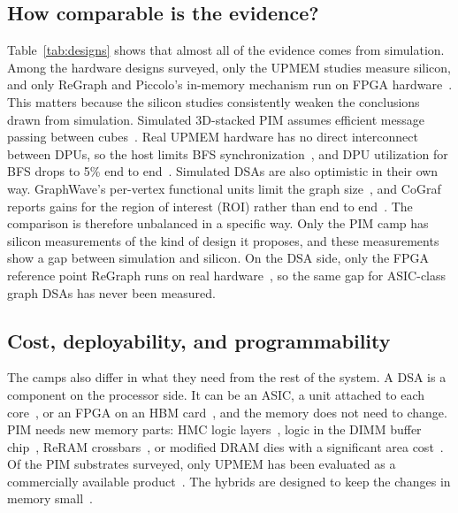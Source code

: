 \documentclass[journal,onecolumn]{IEEEtran}
\begin{document}
\subsection{How comparable is the evidence?}
Table~\ref{tab:designs} shows that almost all of the evidence comes from simulation. Among the hardware designs surveyed, only the UPMEM studies measure silicon, and only ReGraph and Piccolo's in-memory mechanism run on FPGA hardware~\cite{gomezluna2022prim,cai2024pimpam,barkhordar2025alphapim,asquini2025tc,chen2022regraph,shin2025piccolo}. This matters because the silicon studies consistently weaken the conclusions drawn from simulation. Simulated 3D-stacked PIM assumes efficient message passing between cubes~\cite{ahn2015tesseract,zhuo2019graphq}. Real UPMEM hardware has no direct interconnect between DPUs, so the host limits BFS synchronization~\cite{gomezluna2022prim}, and DPU utilization for BFS drops to 5\% end to end~\cite{barkhordar2025alphapim}. Simulated DSAs are also optimistic in their own way. GraphWave's per-vertex functional units limit the graph size~\cite{lee2022graphwave}, and CoGraf reports gains for the region of interest (ROI) rather than end to end~\cite{yenimol2026cograf}. The comparison is therefore unbalanced in a specific way. Only the PIM camp has silicon measurements of the kind of design it proposes, and these measurements show a gap between simulation and silicon. On the DSA side, only the FPGA reference point ReGraph runs on real hardware~\cite{chen2022regraph}, so the same gap for ASIC-class graph DSAs has never been measured.

\subsection{Cost, deployability, and programmability}
The camps also differ in what they need from the rest of the system. A DSA is a component on the processor side. It can be an ASIC, a unit attached to each core~\cite{mukkara2018hats,zhao2022tdgraph}, or an FPGA on an HBM card~\cite{chen2022regraph}, and the memory does not need to change. PIM needs new memory parts: HMC logic layers~\cite{ahn2015tesseract}, logic in the DIMM buffer chip~\cite{talati2022ndminer}, ReRAM crossbars~\cite{song2018graphr}, or modified DRAM dies with a significant area cost~\cite{shin2025fala}. Of the PIM substrates surveyed, only UPMEM has been evaluated as a commercially available product~\cite{gomezluna2022prim}. The hybrids are designed to keep the changes in memory small~\cite{shin2025piccolo,shin2025fala}.
\end{document}
